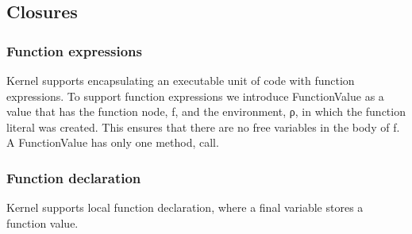 \documentclass{article}
\begin{document}

\subsection{Closures}
\subsubsection{Function expressions}

Kernel supports encapsulating an executable unit of code with function expressions. To support function expressions we introduce FunctionValue as a value that has the function node, f, and the environment, ρ,  in which the function literal was created. This ensures that there are no free variables in the body of f. A FunctionValue has only one method, call.
 
\subsubsection{Function declaration}
Kernel supports local function declaration, where a final variable stores a function value. 
\end{document}
